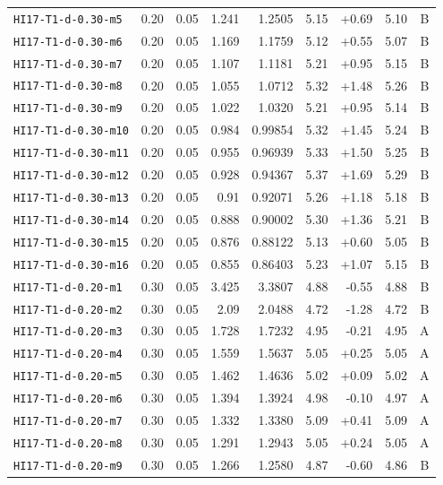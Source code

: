 \begin{longtable}{@{}lrrrrrrrc@{}}
\texttt{HI17-T1-d-0.30-m5} & 0.20 & 0.05 & 1.241 & 1.2505 & 5.15 & +0.69 & 5.10 & B\\
\texttt{HI17-T1-d-0.30-m6} & 0.20 & 0.05 & 1.169 & 1.1759 & 5.12 & +0.55 & 5.07 & B\\
\texttt{HI17-T1-d-0.30-m7} & 0.20 & 0.05 & 1.107 & 1.1181 & 5.21 & +0.95 & 5.15 & B\\
\texttt{HI17-T1-d-0.30-m8} & 0.20 & 0.05 & 1.055 & 1.0712 & 5.32 & +1.48 & 5.26 & B\\
\texttt{HI17-T1-d-0.30-m9} & 0.20 & 0.05 & 1.022 & 1.0320 & 5.21 & +0.95 & 5.14 & B\\
\texttt{HI17-T1-d-0.30-m10} & 0.20 & 0.05 & 0.984 & 0.99854 & 5.32 & +1.45 & 5.24 & B\\
\texttt{HI17-T1-d-0.30-m11} & 0.20 & 0.05 & 0.955 & 0.96939 & 5.33 & +1.50 & 5.25 & B\\
\texttt{HI17-T1-d-0.30-m12} & 0.20 & 0.05 & 0.928 & 0.94367 & 5.37 & +1.69 & 5.29 & B\\
\texttt{HI17-T1-d-0.30-m13} & 0.20 & 0.05 & 0.91 & 0.92071 & 5.26 & +1.18 & 5.18 & B\\
\texttt{HI17-T1-d-0.30-m14} & 0.20 & 0.05 & 0.888 & 0.90002 & 5.30 & +1.36 & 5.21 & B\\
\texttt{HI17-T1-d-0.30-m15} & 0.20 & 0.05 & 0.876 & 0.88122 & 5.13 & +0.60 & 5.05 & B\\
\texttt{HI17-T1-d-0.30-m16} & 0.20 & 0.05 & 0.855 & 0.86403 & 5.23 & +1.07 & 5.15 & B\\
\texttt{HI17-T1-d-0.20-m1} & 0.30 & 0.05 & 3.425 & 3.3807 & 4.88 & -0.55 & 4.88 & B\\
\texttt{HI17-T1-d-0.20-m2} & 0.30 & 0.05 & 2.09 & 2.0488 & 4.72 & -1.28 & 4.72 & B\\
\texttt{HI17-T1-d-0.20-m3} & 0.30 & 0.05 & 1.728 & 1.7232 & 4.95 & -0.21 & 4.95 & A\\
\texttt{HI17-T1-d-0.20-m4} & 0.30 & 0.05 & 1.559 & 1.5637 & 5.05 & +0.25 & 5.05 & A\\
\texttt{HI17-T1-d-0.20-m5} & 0.30 & 0.05 & 1.462 & 1.4636 & 5.02 & +0.09 & 5.02 & A\\
\texttt{HI17-T1-d-0.20-m6} & 0.30 & 0.05 & 1.394 & 1.3924 & 4.98 & -0.10 & 4.97 & A\\
\texttt{HI17-T1-d-0.20-m7} & 0.30 & 0.05 & 1.332 & 1.3380 & 5.09 & +0.41 & 5.09 & A\\
\texttt{HI17-T1-d-0.20-m8} & 0.30 & 0.05 & 1.291 & 1.2943 & 5.05 & +0.24 & 5.05 & A\\
\texttt{HI17-T1-d-0.20-m9} & 0.30 & 0.05 & 1.266 & 1.2580 & 4.87 & -0.60 & 4.86 & B\\

\end{longtable}
